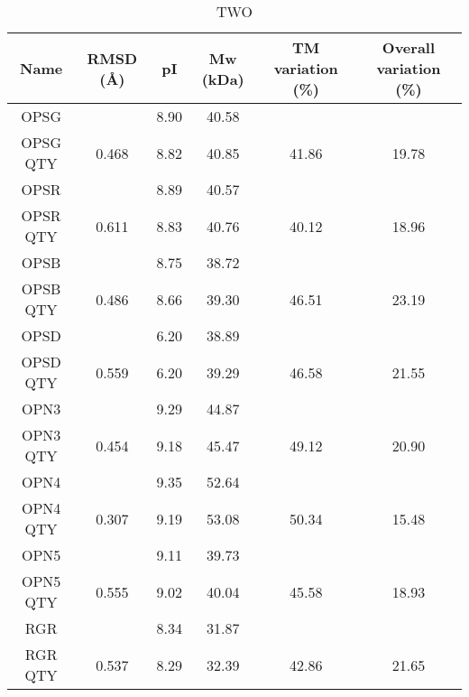 \documentclass[fleqn,10pt,lineno]{manuscript}
\begin{document}


\begin{table}[h]
	\centering
	\caption{TWO}
	\label{tb:2}
	\begin{tabular}{cccccc}
		\toprule
		Name     & RMSD (\AA) & pI   & Mw (kDa) & TM variation (\%) & Overall variation (\%) \\
		\toprule
		OPSG     &                 & 8.90 & 40.58    &                   &                        \\
		OPSG QTY & 0.468           & 8.82 & 40.85    & 41.86             & 19.78                  \\
		\midrule
		OPSR     &                 & 8.89 & 40.57    &                   &                        \\
		OPSR QTY & 0.611           & 8.83 & 40.76    & 40.12             & 18.96                  \\
		\midrule
		OPSB     &                 & 8.75 & 38.72    &                   &                        \\
		OPSB QTY & 0.486           & 8.66 & 39.30    & 46.51             & 23.19                  \\
		\midrule
		OPSD     &                 & 6.20 & 38.89    &                   &                        \\
		OPSD QTY & 0.559           & 6.20 & 39.29    & 46.58             & 21.55                  \\
		\midrule
		OPN3     &                 & 9.29 & 44.87    &                   &                        \\
		OPN3 QTY & 0.454           & 9.18 & 45.47    & 49.12             & 20.90                  \\
		\midrule
		OPN4     &                 & 9.35 & 52.64    &                   &                        \\
		OPN4 QTY & 0.307           & 9.19 & 53.08    & 50.34             & 15.48                  \\
		\midrule
		OPN5     &                 & 9.11 & 39.73    &                   &                        \\
		OPN5 QTY & 0.555           & 9.02 & 40.04    & 45.58             & 18.93                  \\
		\midrule
		RGR      &                 & 8.34 & 31.87    &                   &                        \\
		RGR QTY  & 0.537           & 8.29 & 32.39    & 42.86             & 21.65                  \\

\end{tabular}
\end{table}
\end{document}
